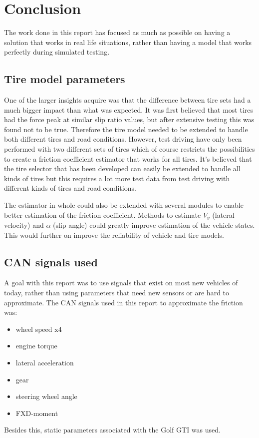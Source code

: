 \chapter{Conclusion}

The work done in this report has focused as much as possible on having a solution that works in real life situations, rather than having a model that works perfectly during simulated testing. 

\section{Tire model parameters}
One of the larger insights acquire was that the difference between tire sets had a much bigger impact than what was expected. It was first believed that most tires had the force peak at similar slip ratio values, but after extensive testing this was found not to be true. Therefore the tire model needed to be extended to handle both different tires and road conditions. However, test driving have only been performed with two different sets of tires which of course restricts the possibilities to create a friction coefficient estimator that works for all tires. It's believed that the tire selector that has been developed can easily be extended to handle all kinds of tires but this requires a lot more test data from test driving with different kinds of tires and road conditions.

The estimator in whole could also be extended with several modules to enable better estimation of the friction coefficient. Methods to estimate $ V_{y} $ (lateral velocity) and $ \alpha $ (slip angle) could greatly improve estimation of the vehicle states. This would further on improve the reliability of vehicle and tire models.

\section{CAN signals used}
A goal with this report was to use signals that exist on most new vehicles of today, rather than using parameters that need new sensors or are hard to approximate. The CAN signals used in this report to approximate the friction was:
\begin{itemize}
	\item wheel speed x4
	\item engine torque
	\item lateral acceleration
	\item gear
	\item steering wheel angle
	\item FXD-moment
\end{itemize}
Besides this, static parameters associated with the Golf GTI was used.  
